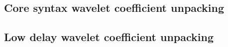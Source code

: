 \label{wltunpacking}

\subsection{Core syntax wavelet coefficient unpacking}
\subsection{Low delay wavelet coefficient unpacking}